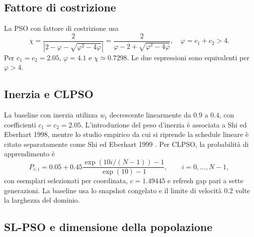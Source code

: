 \subsection{Fattore di costrizione}

La PSO con fattore di costrizione usa
\begin{equation}
 \chi=\frac{2}{\left|2-\varphi-\sqrt{\varphi^2-4\varphi}\right|}
 =\frac{2}{\varphi-2+\sqrt{\varphi^2-4\varphi}},
 \quad \varphi=c_1+c_2>4.
 \label{eq:app-clerc}
\end{equation}
Per $c_1=c_2=2.05$, $\varphi=4.1$ e $\chi\simeq0.7298$. Le due espressioni sono equivalenti per $\varphi>4$.

\subsection{Inerzia e CLPSO}

La baseline con inerzia utilizza $w_t$ decrescente linearmente da $0.9$ a $0.4$, con coefficienti $c_1=c_2=2.05$. L'introduzione del peso d'inerzia è associata a Shi ed Eberhart 1998, mentre lo studio empirico da cui si riprende la schedule lineare è citato separatamente come Shi ed Eberhart 1999 \citep{ShiEberhart1998,ShiEberhart1999}. Per CLPSO, la probabilità di apprendimento è
\begin{equation}
 P_{c,i}=0.05+0.45\frac{\exp\left(10i/(N-1)\right)-1}{\exp(10)-1},
 \qquad i=0,\ldots,N-1,
 \label{eq:app-clpso-pc}
\end{equation}
con esemplari selezionati per coordinata, $c=1.49445$ e refresh gap pari a sette generazioni. La baseline usa lo snapshot congelato e il limite di velocità $0.2$ volte la larghezza del dominio.

\subsection{SL-PSO e dimensione della popolazione}

